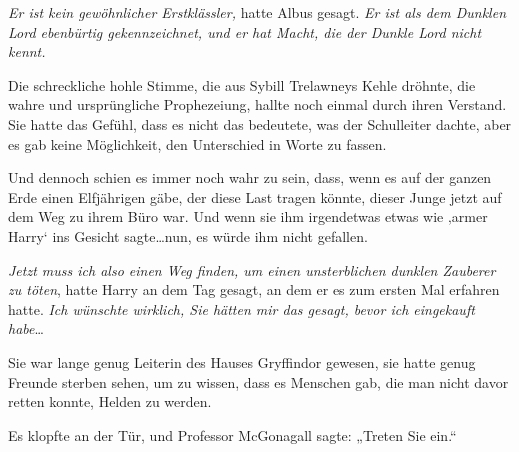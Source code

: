 \emph{Er ist kein gewöhnlicher Erstklässler,} hatte Albus gesagt. \emph{Er ist als dem Dunklen Lord ebenbürtig gekennzeichnet, und er hat Macht, die der Dunkle Lord nicht kennt.}

Die schreckliche hohle Stimme, die aus Sybill Trelawneys Kehle dröhnte, die wahre und ursprüngliche Prophezeiung, hallte noch einmal durch ihren Verstand. Sie hatte das Gefühl, dass es nicht das bedeutete, was der Schulleiter dachte, aber es gab keine Möglichkeit, den Unterschied in Worte zu fassen.

Und dennoch schien es immer noch wahr zu sein, dass, wenn es auf der ganzen Erde einen Elfjährigen gäbe, der diese Last tragen könnte, dieser Junge jetzt auf dem Weg zu ihrem Büro war. Und wenn sie ihm irgendetwas etwas wie ‚armer Harry‘ ins Gesicht sagte…nun, es würde ihm nicht gefallen.

\emph{Jetzt muss ich also einen Weg finden, um einen unsterblichen dunklen Zauberer zu töten}, hatte Harry an dem Tag gesagt, an dem er es zum ersten Mal erfahren hatte. \emph{Ich wünschte wirklich, Sie hätten mir das gesagt, bevor ich eingekauft habe}…

Sie war lange genug Leiterin des Hauses Gryffindor gewesen, sie hatte genug Freunde sterben sehen, um zu wissen, dass es Menschen gab, die man nicht davor retten konnte, Helden zu werden.

Es klopfte an der Tür, und Professor McGonagall sagte:
„Treten Sie ein.“

